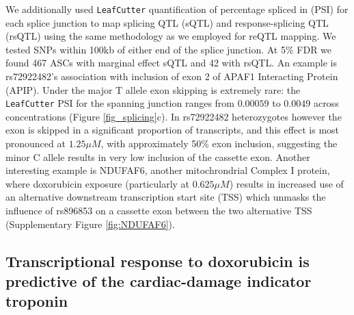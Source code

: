 \documentclass{article}
\begin{document}
{We additionally used \texttt{LeafCutter} quantification of percentage spliced in (PSI) for each splice junction to map splicing QTL (sQTL) and response-splicing QTL (rsQTL) using the same methodology as we employed for reQTL mapping. We tested SNPs within 100kb of either end of the splice junction. At 5\% FDR we found 467 ASCs with marginal effect sQTL and 42 with rsQTL. An example is rs72922482's association with inclusion of exon 2 of APAF1 Interacting Protein (APIP). Under the major T allele exon skipping is extremely rare: the \texttt{LeafCutter} PSI for the spanning junction ranges from $0.00059$ to $0.0049$ across concentrations (Figure \ref{fig_splicing}c). In rs72922482 heterozygotes however the exon is skipped in a significant proportion of transcripts, and this effect is most pronounced at $1.25 \mu M$, with approximately 50\% exon inclusion, suggesting the minor C allele results in very low inclusion of the cassette exon. Another interesting example is NDUFAF6, another mitochrondrial Complex I protein, where doxorubicin exposure (particularly at $0.625 \mu M$) results in increased use of an alternative downstream transcription start site (TSS) which unmasks the influence of rs896853 on a cassette exon between the two alternative TSS (Supplementary Figure \ref{fig:NDUFAF6}).

\subsection*{Transcriptional response to doxorubicin is predictive of the cardiac-damage indicator troponin}

}
\end{document}
